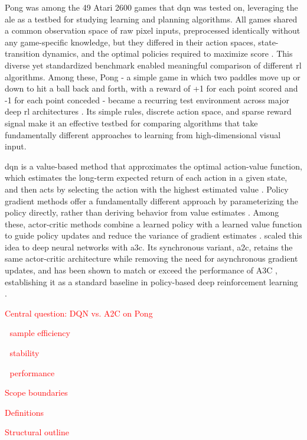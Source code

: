 Pong was among the 49 Atari 2600 games that \acrshort{dqn} was tested on, leveraging the \acrfull{ale} \citep{bellemareArcadeLearningEnvironment2013} as a testbed for studying learning and planning algorithms. All games shared a common observation space of raw pixel inputs, preprocessed identically without any game-specific knowledge, but they differed in their action spaces, state-transition dynamics, and the optimal policies required to maximize score \citep[p.~437]{suttonReinforcementLearningIntroduction2020}. This diverse yet standardized benchmark enabled meaningful comparison of different \acrshort{rl} algorithms. Among these, Pong - a simple game in which two paddles move up or down to hit a ball back and forth, with a reward of +1 for each point scored and -1 for each point conceded - became a recurring test environment across major deep \acrshort{rl} architectures \citep{mnihHumanlevelControlDeep2015,mnihAsynchronousMethodsDeep2016,schulmanProximalPolicyOptimization2017}. Its simple rules, discrete action space, and sparse reward signal make it an effective testbed for comparing algorithms that take fundamentally different approaches to learning from high-dimensional visual input.

\acrshort{dqn} is a value-based method that approximates the optimal action-value function, which estimates the long-term expected return of each action in a given state, and then acts by selecting the action with the highest estimated value \citep[p.~529]{mnihHumanlevelControlDeep2015}. Policy gradient methods offer a fundamentally different approach by parameterizing the policy directly, rather than deriving behavior from value estimates \citep[p.~321]{suttonReinforcementLearningIntroduction2020}. Among these, actor-critic methods combine a learned policy with a learned value function to guide policy updates and reduce the variance of gradient estimates \citep[p.~331]{suttonReinforcementLearningIntroduction2020}. \citet{mnihAsynchronousMethodsDeep2016} scaled this idea to deep neural networks with \acrfull{a3c}. Its synchronous variant, \acrfull{a2c}, retains the same actor-critic architecture while removing the need for asynchronous gradient updates, and has been shown to match or exceed the performance of A3C \citep{openaiBaselineACKTRA2C2017}, establishing it as a standard baseline in policy-based deep reinforcement learning \citep{dhariwalOpenAIBaselines2017}.

\textcolor{red}{Central question: DQN vs. A2C on Pong}

$\;$ \textcolor{red}{sample efficiency}

$\;$ \textcolor{red}{stability}

$\;$ \textcolor{red}{performance}

\textcolor{red}{Scope boundaries}

\textcolor{red}{Definitions}

\textcolor{red}{Structural outline}